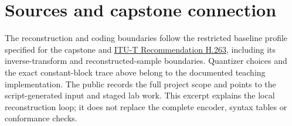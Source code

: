 \section*{Sources and capstone connection}
The reconstruction and coding boundaries follow the restricted baseline profile
specified for the capstone and \href{https://www.itu.int/rec/T-REC-H.263-200501-I/en}{ITU-T Recommendation H.263},
including its inverse-transform and reconstructed-sample boundaries. Quantizer
choices and the exact constant-block trace above belong to the documented teaching
implementation. The public  records the full project
scope and points to the script-generated input and staged lab work. This excerpt
explains the local reconstruction loop; it does not replace the complete encoder,
syntax tables or conformance checks.
